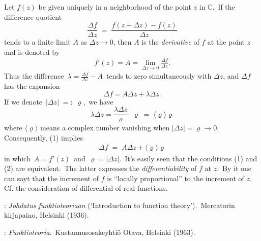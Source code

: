 \documentclass[12pt]{article}
\begin{document}
Let $f(z)$ be given uniquely in a neighborhood of the point 
$z$ in $\mathbb{C}$.\, If the difference quotient
$$\frac{\Delta f}{\Delta z} \;=\; \frac{f(z+\Delta z)-f(z)}{\Delta z}$$
tends to a finite limit $A$ as $\Delta z \to 0$,
then $A$ is the {\it derivative} of $f$ at the point $z$ and is denoted by 
\begin{align}
f'(z) = A = \lim_{\Delta z \to 0}\frac{\Delta f}{\Delta z}.
\end{align}
Thus the difference\, $\lambda = \frac{\Delta f}{\Delta z}-A$\, tends to 
zero simultaneously with $\Delta z$, and $\Delta f$ has the expansion
$$\Delta f = A\Delta z+\lambda\Delta z.$$
If we denote\, $|\Delta z| \;=:\; \varrho$,\, we have
$$\lambda\Delta z = \frac{\lambda\Delta z}{\varrho}\cdot\varrho
\;=\; \langle\varrho\rangle\varrho$$
where $\langle\varrho\rangle$ means a complex number vanishing when 
$|\Delta z| = \varrho \to 0$.\, Consequently, (1) implies
\begin{align}
\Delta f \;=\; A\Delta z+\langle\varrho\rangle\varrho
\end{align}
in which\, $A = f'(z)$\, and\, $\varrho = |\Delta z|$.\, It's easily seen that 
the conditions (1) and (2) are equivalent.\, The latter expresses the 
{\it differentiability} of $f$ at $z$.\, By it one can sayt that the increment of 
$f$ is ``locally proportional'' to the increment of $z$.\, Cf. the 
consideration of differential of real functions.\\

\begin{thebibliography}{9}
: {\em Johdatus funktioteoriaan} (`Introduction to function theory').\, Mercatorin kirjapaino, Helsinki (1936).

: {\em Funktioteoria}.\, Kustannusosakeyhti\"o Otava, Helsinki (1963).
\end{thebibliography}\\
\end{document}
